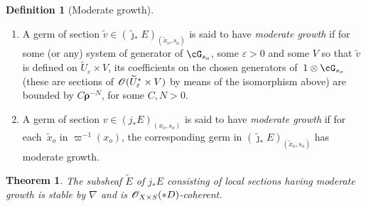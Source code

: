 \documentclass[english]{smfart}
\numberwithin{subsection}{section}
\newenvironment{enumeratea}
{\bgroup\def\theenumi{\alph{enumi}}\begin{enumerate}}
{\end{enumerate}\egroup}
\newcommand{\rhog}{\boldsymbol{\rho}}
\newcommand{\XS}{X\times S}
\let\wt\widetilde
\let\epsilon\varepsilon
\def\wtj{\wt\jmath}
\numberwithin{equation}{section}
\theoremstyle{plain}
\newtheorem{theorem}[equation]{Theorem}
\theoremstyle{definition}
\newtheorem{definition}[equation]{Definition}
\begin{document}
\begin{definition}[Moderate growth]\label{def:mod}\mbox{}
\begin{enumeratea}
\item
A germ of section $\wt v\in(\wtj_*E)_{(\wt x_o,s_o)}$ is said to have \emph{moderate growth} if for some (or any) system of generator of $\cG_{s_o}$, some $\epsilon>0$ and some $V$ so that $\wt v$ is defined on $\wt U_\epsilon\times V$, its coefficients on the chosen generators of~$1\otimes\cG_{s_o}$ (these are sections of $\cO(\wt U^*_\epsilon\times V)$ by means of the isomorphism above) are bounded by $C\rhog^{-N}$, for some $C,N>0$.

\item
A germ of section $v\in(j_*E)_{(x_o,s_o)}$ is said to have \emph{moderate growth} if for each~$\wt x_o$ in $\varpi^{-1}(x_o)$, the corresponding germ in $(\wtj_*E)_{(\wt x_o,s_o)}$ has moderate growth.
\end{enumeratea}
\end{definition}

\begin{theorem}\label{th:Deligneext}
The subsheaf $\wt E$ of $j_*E$ consisting of local sections having moderate growth is stable by $\nabla$ and is $\cO_{\XS}(*D)$-coherent.
\end{theorem}
\end{document}
